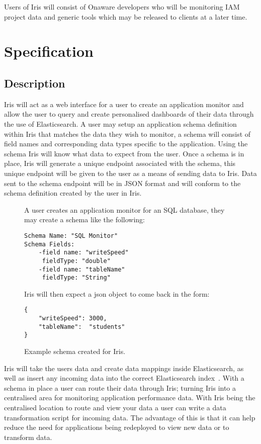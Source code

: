 \documentclass[12pt,a4paper,titlepage]{report}
\begin{document}
Users of Iris will consist of Onaware developers who will be monitoring IAM project data and generic tools which may be released to clients at a later time.


\chapter{Specification}

\section{Description}

Iris will act as a web interface for a user to create an application monitor and allow the user to query and create personalised dashboards of their data through the use of Elasticsearch. A user may setup an application schema definition within Iris that matches the data they wish to monitor, a schema will consist of field names and corresponding data types specific to the application. Using the schema Iris will know what data to expect from the user. Once a schema is in place, Iris will generate a unique endpoint associated with the schema, this unique endpoint will be given to the user as a means of sending data to Iris. Data sent to the schema endpoint will be in JSON format and will conform to the schema definition created by the user in Iris.
\begin{figure}[H]
\begin{tcolorbox}
A user creates an application monitor for an SQL database, they may create a schema like the following:
\begin{verbatim}
Schema Name: "SQL Monitor"
Schema Fields:
    -field name: "writeSpeed"
     fieldType: "double"
    -field name: "tableName"
     fieldType: "String"
\end{verbatim}	
Iris will then expect a json object to come back in the form:
\begin{verbatim}
{
	"writeSpeed": 3000,
	"tableName":  "students"
}
\end{verbatim}
\end{tcolorbox}
\caption{Example schema created for Iris.}
\end{figure}

Iris will take the users data and create data mappings 
\parencite{Elastic.co.Mapping} inside Elasticsearch, as well as insert any incoming data into the correct Elasticsearch index~\parencite{Elastic.co.Basic}. With a schema in place a user can route their data through Iris; turning Iris into a centralised area for monitoring application performance data. With Iris being the centralised location to route and view your data a user can write a data transformation script for incoming data. The advantage of this is that it can help reduce the need for applications being redeployed to view new data or to transform data.
\end{document}
